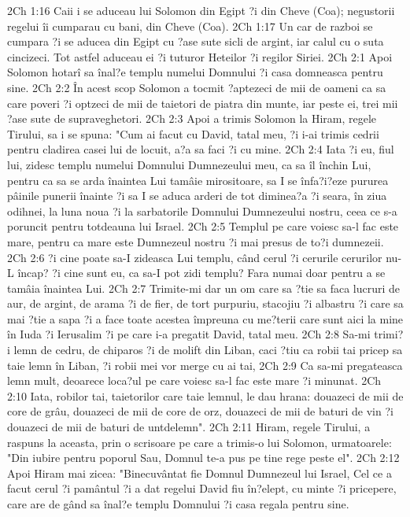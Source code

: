 2Ch 1:16  Caii i se aduceau lui Solomon din Egipt ?i din Cheve (Coa); negustorii regelui îi cumparau cu bani, din Cheve (Coa).
2Ch 1:17  Un car de razboi se cumpara ?i se aducea din Egipt cu ?ase sute sicli de argint, iar calul cu o suta cincizeci. Tot astfel aduceau ei ?i tuturor Heteilor ?i regilor Siriei.
2Ch 2:1  Apoi Solomon hotarî sa înal?e templu numelui Domnului ?i casa domneasca pentru sine.
2Ch 2:2  În acest scop Solomon a tocmit ?aptezeci de mii de oameni ca sa care poveri ?i optzeci de mii de taietori de piatra din munte, iar peste ei, trei mii ?ase sute de supraveghetori.
2Ch 2:3  Apoi a trimis Solomon la Hiram, regele Tirului, sa i se spuna: "Cum ai facut cu David, tatal meu, ?i i-ai trimis cedrii pentru cladirea casei lui de locuit, a?a sa faci ?i cu mine.
2Ch 2:4  Iata ?i eu, fiul lui, zidesc templu numelui Domnului Dumnezeului meu, ca sa îl închin Lui, pentru ca sa se arda înaintea Lui tamâie mirositoare, sa I se înfa?i?eze pururea pâinile punerii înainte ?i sa I se aduca arderi de tot diminea?a ?i seara, în ziua odihnei, la luna noua ?i la sarbatorile Domnului Dumnezeului nostru, ceea ce s-a poruncit pentru totdeauna lui Israel.
2Ch 2:5  Templul pe care voiesc sa-l fac este mare, pentru ca mare este Dumnezeul nostru ?i mai presus de to?i dumnezeii.
2Ch 2:6  ?i cine poate sa-I zideasca Lui templu, când cerul ?i cerurile cerurilor nu-L încap? ?i cine sunt eu, ca sa-I pot zidi templu? Fara numai doar pentru a se tamâia înaintea Lui.
2Ch 2:7  Trimite-mi dar un om care sa ?tie sa faca lucruri de aur, de argint, de arama ?i de fier, de tort purpuriu, stacojiu ?i albastru ?i care sa mai ?tie a sapa ?i a face toate acestea împreuna cu me?terii care sunt aici la mine în Iuda ?i Ierusalim ?i pe care i-a pregatit David, tatal meu.
2Ch 2:8  Sa-mi trimi?i lemn de cedru, de chiparos ?i de molift din Liban, caci ?tiu ca robii tai pricep sa taie lemn în Liban, ?i robii mei vor merge cu ai tai,
2Ch 2:9  Ca sa-mi pregateasca lemn mult, deoarece loca?ul pe care voiesc sa-l fac este mare ?i minunat.
2Ch 2:10  Iata, robilor tai, taietorilor care taie lemnul, le dau hrana: douazeci de mii de core de grâu, douazeci de mii de core de orz, douazeci de mii de baturi de vin ?i douazeci de mii de baturi de untdelemn".
2Ch 2:11  Hiram, regele Tirului, a raspuns la aceasta, prin o scrisoare pe care a trimis-o lui Solomon, urmatoarele: "Din iubire pentru poporul Sau, Domnul te-a pus pe tine rege peste el".
2Ch 2:12  Apoi Hiram mai zicea: "Binecuvântat fie Domnul Dumnezeul lui Israel, Cel ce a facut cerul ?i pamântul ?i a dat regelui David fiu în?elept, cu minte ?i pricepere, care are de gând sa înal?e templu Domnului ?i casa regala pentru sine.
